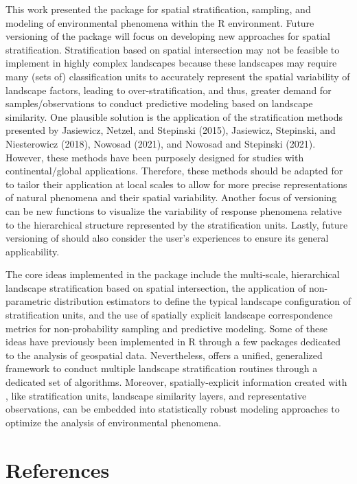 This work presented the  package for spatial stratification,
sampling, and modeling of environmental phenomena within the R environment.
Future versioning of the  package will focus on developing new
approaches for spatial stratification. Stratification based on spatial
intersection may not be feasible to implement in highly complex landscapes
because these landscapes may require many (sets of) classification units to
accurately represent the spatial variability of landscape factors, leading to
over-stratification, and thus, greater demand for samples/observations to
conduct predictive modeling based on landscape similarity. One plausible
solution is the application of the stratification methods presented by
Jasiewicz, Netzel, and Stepinski (2015), Jasiewicz, Stepinski, and Niesterowicz (2018), Nowosad (2021), and Nowosad and Stepinski (2021).
However, these methods have been purposely designed for studies with
continental/global applications. Therefore, these methods should be adapted for
 to tailor their application at local scales to allow for more
precise representations of natural phenomena and their spatial variability.
Another focus of versioning can be new functions to visualize the variability of
response phenomena relative to the hierarchical structure represented by the
stratification units. Lastly, future versioning of  should also
consider the user's experiences to ensure its general applicability.

The core ideas implemented in the  package include the multi-scale,
hierarchical landscape stratification based on spatial intersection, the
application of non-parametric distribution estimators to define the typical
landscape configuration of stratification units, and the use of spatially
explicit landscape correspondence metrics for non-probability sampling and
predictive modeling. Some of these ideas have previously been implemented in R
through a few packages dedicated to the analysis of geospatial data.
Nevertheless,  offers a unified, generalized framework to conduct
multiple landscape stratification routines through a dedicated set of
algorithms. Moreover, spatially-explicit information created with ,
like stratification units, landscape similarity layers, and representative
observations, can be embedded into statistically robust modeling approaches to
optimize the analysis of environmental phenomena.

\hypertarget{references}{%
\section*{References}\label{references}}

